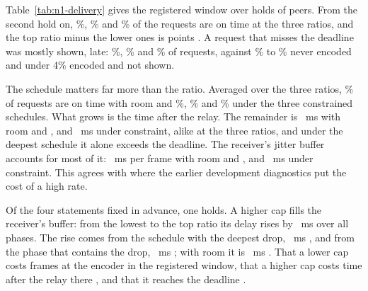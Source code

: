 \begin{table}[t]
\centering\small
\resizebox{\linewidth}{!}{}
\caption{What became of the capture requests of the registered window, by requested ratio, from the second hold on. Shares are of the window's requests; ages and times are means over sources in ms; ``rest'' is the mean age of the shown frames minus encoder, pacer and relay. Brackets are 95\% $t$ intervals over sources for the top ratio minus the mean of the two lower ones. Exploratory; timing labels were read and no PSNR.}
\label{tab:n1-delivery}
\end{table}

Table~\ref{tab:n1-delivery} gives the registered window over \NOneDelHolds{} holds of \NOneDelPeers{} peers. From the second hold on, \NOneDelOnTimeLow\%, \NOneDelOnTimeMid\% and \NOneDelOnTimeTop\% of the requests are on time at the three ratios, and the top ratio minus the lower ones is \NOneDelOnTimeDiff{} points \NOneDelOnTimeDiffT. A request that misses the deadline was mostly shown, late: \NOneDelLateLow\%, \NOneDelLateMid\% and \NOneDelLateTop\% of requests, against \NOneDelNeverLow\% to \NOneDelNeverMid\% never encoded and under 4\% encoded and not shown.

The schedule matters far more than the ratio. Averaged over the three ratios, \NOneDelRoomOnTime\% of requests are on time with room and \NOneDelNearOnTime\%, \NOneDelShallowOnTime\% and \NOneDelDeepOnTime\% under the three constrained schedules. What grows is the time after the relay. The remainder is \NOneDelRoomRest~ms with room and \NOneDelNearRest, \NOneDelShallowRest{} and \NOneDelDeepRest~ms under constraint, alike at the three ratios, and under the deepest schedule it alone exceeds the deadline. The receiver's jitter buffer accounts for most of it: \NOneDelRoomBuffer~ms per frame with room and \NOneDelNearBuffer, \NOneDelShallowBuffer{} and \NOneDelDeepBuffer~ms under constraint. This agrees with where the earlier development diagnostics put the cost of a high rate.

Of the four statements fixed in advance, one holds. A higher cap fills the receiver's buffer: from the lowest to the top ratio its delay rises by \NOneDelBufferSlope~ms \NOneDelBufferSlopeT{} over all \NOneDelPhases{} phases. The rise comes from the schedule with the deepest drop, \NOneDelDeepBufferSlope~ms \NOneDelDeepBufferSlopeT, and from the phase that contains the drop, \NOneDelPhaseTwoBufferSlope~ms \NOneDelPhaseTwoBufferSlopeT; with room it is \NOneDelRoomBufferSlope~ms \NOneDelRoomBufferSlopeT. That a lower cap costs frames at the encoder \NOneDelEncoderCost{} in the registered window, that a higher cap costs time after the relay there \NOneDelRestCost, and that it reaches the deadline \NOneDelDeadline.

